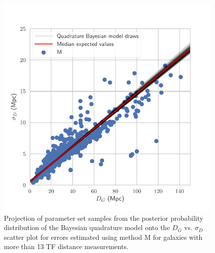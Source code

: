 \documentclass[a4paper,fleqn,usenatbib]{mnras}
\begin{document}
\begin{figure}
	\includegraphics[scale=0.7]{drawsq2}
    \caption{Projection of parameter set samples from the posterior probability distribution of the Bayesian quadrature model onto the $D_G$ vs. $\sigma_D$ scatter plot for errors estimated using method M for galaxies with more than 13 TF distance measurements.}
    \label{fig:drawsq2}
\end{figure}
\end{document}
